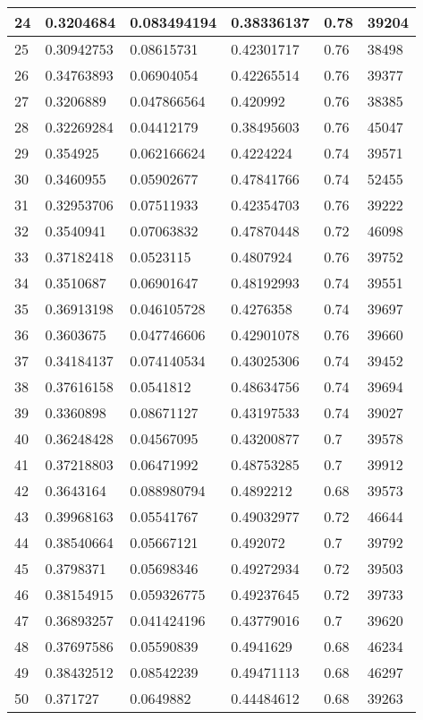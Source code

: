 \begin{longtable}{|l|l|l|l|l|l|}
24 & 0.3204684 & 0.083494194 & 0.38336137 & 0.78 & 39204 \\ \hline 
25 & 0.30942753 & 0.08615731 & 0.42301717 & 0.76 & 38498 \\ \hline 
26 & 0.34763893 & 0.06904054 & 0.42265514 & 0.76 & 39377 \\ \hline 
27 & 0.3206889 & 0.047866564 & 0.420992 & 0.76 & 38385 \\ \hline 
28 & 0.32269284 & 0.04412179 & 0.38495603 & 0.76 & 45047 \\ \hline 
29 & 0.354925 & 0.062166624 & 0.4224224 & 0.74 & 39571 \\ \hline 
30 & 0.3460955 & 0.05902677 & 0.47841766 & 0.74 & 52455 \\ \hline 
31 & 0.32953706 & 0.07511933 & 0.42354703 & 0.76 & 39222 \\ \hline 
32 & 0.3540941 & 0.07063832 & 0.47870448 & 0.72 & 46098 \\ \hline 
33 & 0.37182418 & 0.0523115 & 0.4807924 & 0.76 & 39752 \\ \hline 
34 & 0.3510687 & 0.06901647 & 0.48192993 & 0.74 & 39551 \\ \hline 
35 & 0.36913198 & 0.046105728 & 0.4276358 & 0.74 & 39697 \\ \hline 
36 & 0.3603675 & 0.047746606 & 0.42901078 & 0.76 & 39660 \\ \hline 
37 & 0.34184137 & 0.074140534 & 0.43025306 & 0.74 & 39452 \\ \hline 
38 & 0.37616158 & 0.0541812 & 0.48634756 & 0.74 & 39694 \\ \hline 
39 & 0.3360898 & 0.08671127 & 0.43197533 & 0.74 & 39027 \\ \hline 
40 & 0.36248428 & 0.04567095 & 0.43200877 & 0.7 & 39578 \\ \hline 
41 & 0.37218803 & 0.06471992 & 0.48753285 & 0.7 & 39912 \\ \hline 
42 & 0.3643164 & 0.088980794 & 0.4892212 & 0.68 & 39573 \\ \hline 
43 & 0.39968163 & 0.05541767 & 0.49032977 & 0.72 & 46644 \\ \hline 
44 & 0.38540664 & 0.05667121 & 0.492072 & 0.7 & 39792 \\ \hline 
45 & 0.3798371 & 0.05698346 & 0.49272934 & 0.72 & 39503 \\ \hline 
46 & 0.38154915 & 0.059326775 & 0.49237645 & 0.72 & 39733 \\ \hline 
47 & 0.36893257 & 0.041424196 & 0.43779016 & 0.7 & 39620 \\ \hline 
48 & 0.37697586 & 0.05590839 & 0.4941629 & 0.68 & 46234 \\ \hline 
49 & 0.38432512 & 0.08542239 & 0.49471113 & 0.68 & 46297 \\ \hline 
50 & 0.371727 & 0.0649882 & 0.44484612 & 0.68 & 39263 \\ \hline 
\end{longtable}